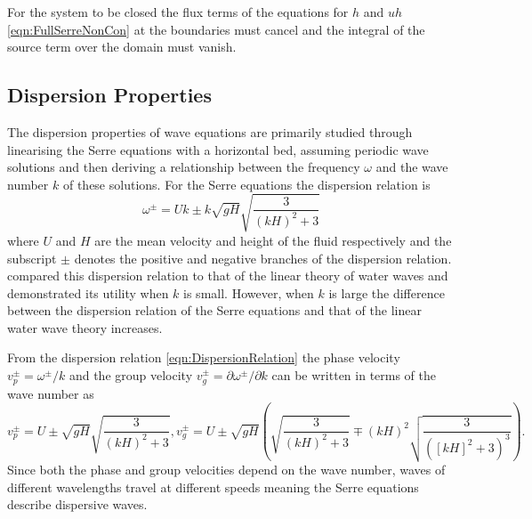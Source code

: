 For the system to be closed the flux terms of the equations for $h$ and $uh$ \eqref{eqn:FullSerreNonCon} at the boundaries must cancel and the integral of the source term over the domain must vanish.

\subsection{Dispersion Properties}
The dispersion properties of wave equations are primarily studied through linearising the Serre equations with a horizontal bed, assuming periodic wave solutions and then deriving a relationship between the frequency $\omega$ and the wave number $k$ of these solutions. For the Serre equations the dispersion relation \cite{Li-2014-169} is
\begin{equation}
\label{eqn:DispersionRelation}
\omega^\pm = Uk \pm k \sqrt{gH} \sqrt{\frac{3}{\left(kH\right)^2 + 3}}
\end{equation}
where $U$ and $H$ are the mean velocity and height of the fluid respectively and the subscript $\pm$ denotes the positive and negative branches of the dispersion relation. \citet{Barthelemy-2004-315} compared this dispersion relation to that of the linear theory of water waves and demonstrated its utility when $k$ is small. However, when $k$ is large the difference between the dispersion relation of the Serre equations and that of the linear water wave theory increases. 


From the dispersion relation \eqref{eqn:DispersionRelation} the phase velocity $v_p^\pm = \omega^\pm / k$  and the group velocity $v_g^\pm = \partial \omega^\pm / \partial  k$ can be written in terms of the wave number as
\begin{subequations}
	\label{eqn:WaveVelocities}
	\begin{equation}
	\label{eqn:WaveVelocitiesPhase}
	v_p^\pm = U \pm \sqrt{gH}\sqrt{\frac{3}{\left(kH\right)^2 + 3}},
	\end{equation}
	\begin{equation}
	\label{eqn:WaveVelocitiesGroup}
	v_g^\pm = U \pm \sqrt{gH} \left(\sqrt{\frac{3}{\left(kH\right)^2 + 3}} \mp \left(kH\right)^2 \sqrt{\frac{3}{\left(\left[kH\right]^2 + 3 \right)^3}}\right).
	\end{equation}
\end{subequations}
Since both the phase and group velocities depend on the wave number, waves of different wavelengths travel at different speeds meaning the Serre equations describe dispersive waves.

